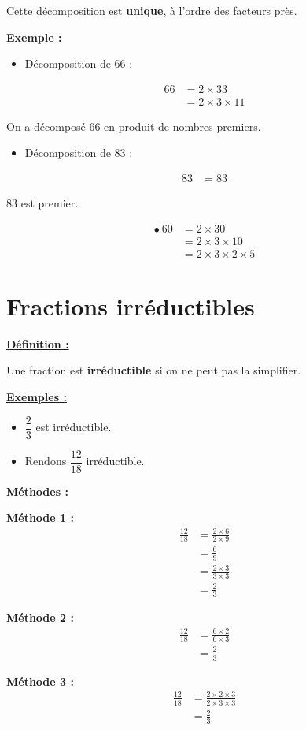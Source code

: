\documentclass[13pt]{extarticle}
\newcommand{\blocTitre}[1]{%
  \vspace{1em}%
  \noindent\underline{\textbf{#1 :}}\par%
  \vspace{0.3em}%
}
\begin{document}
Cette décomposition est \textbf{unique}, à l'ordre des facteurs près.

\blocTitre{Exemple}

\begin{itemize}
  \item Décomposition de 66 :
\end{itemize}

\[
\begin{aligned}
66 &= 2 \times 33 \\
   &= 2 \times 3 \times 11
\end{aligned}
\]

On a décomposé 66 en produit de nombres premiers.

\begin{itemize}
  \item Décomposition de 83 :
\end{itemize}

\[
\begin{aligned}
83 &= 83
\end{aligned}
\]

83 est premier.


\[
\begin{aligned}
\bullet\ 60 &= 2 \times 30 \\
            &= 2 \times 3 \times 10 \\
            &= 2 \times 3 \times 2 \times 5
\end{aligned}
\]

\section{Fractions irréductibles}

\blocTitre{Définition}

Une fraction est \textbf{irréductible} si on ne peut pas la simplifier.

\blocTitre{Exemples}

\begin{itemize}
  \item $\dfrac{2}{3}$ est irréductible.
  \item Rendons $\dfrac{12}{18}$ irréductible.
\end{itemize}

\textbf{Méthodes :}

\medskip

\textbf{Méthode 1 :}
\[
\begin{aligned}
\frac{12}{18} &= \frac{2 \times 6}{2 \times 9} \\
              &= \frac{6}{9} \\
              &= \frac{2 \times 3}{3 \times 3} \\
              &= \frac{2}{3}
\end{aligned}
\]

\textbf{Méthode 2 :}
\[
\begin{aligned}
\frac{12}{18} &= \frac{6 \times 2}{6 \times 3} \\
              &= \frac{2}{3}
\end{aligned}
\]

\textbf{Méthode 3 :}
\[
\begin{aligned}
\frac{12}{18} &= \frac{2 \times 2 \times 3}{2 \times 3 \times 3} \\
              &= \frac{2}{3}
\end{aligned}
\]
\end{document}
